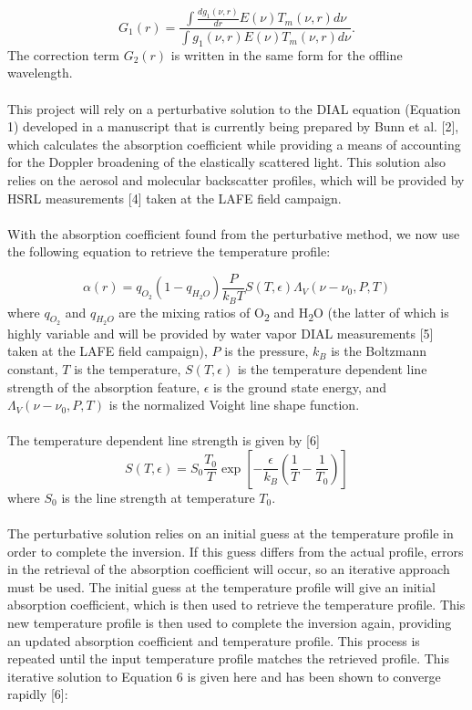 \documentclass[twoside]{article}
\begin{document}
\begin{equation}
	G_1(r) = \frac{\int \frac{dg_1(\nu,r)}{dr} E(\nu) T_m(\nu,r) d\nu}{\int g_1(\nu,r) E(\nu) T_m(\nu,r) d\nu}.
\end{equation}
\noindent The correction term $G_2(r)$ is written in the same form for the offline wavelength.
\\
\\
This project will rely on a perturbative solution to the DIAL equation (Equation 1) developed in a manuscript that is currently being prepared by Bunn et al. [2], which calculates the absorption coefficient while providing a means of accounting for the Doppler broadening of the elastically scattered light. This solution also relies on the aerosol and molecular backscatter profiles, which will be provided by HSRL measurements [4] taken at the LAFE field campaign.
\\
\\
With the absorption coefficient found from the perturbative method, we now use the following equation to retrieve the temperature profile:

\begin{equation}
	\alpha (r) = q_{O_2} (1 - q_{H_2 O}) \frac{P}{k_B T} S(T,\epsilon) \Lambda_V(\nu - \nu_0,P,T)
\end{equation} 
\noindent where $q_{O_2}$ and $q_{H_2 O}$ are the mixing ratios of O\textsubscript{2} and H\textsubscript{2}O (the latter of which is highly variable and will be provided by water vapor DIAL measurements [5] taken at the LAFE field campaign), $P$ is the pressure, $k_B$ is the Boltzmann constant, $T$ is the temperature, $S(T,\epsilon)$ is the temperature dependent line strength of the absorption feature, $\epsilon$ is the ground state energy, and $\Lambda_V(\nu - \nu_0,P,T)$ is the normalized Voight line shape function.
\\
\\
The temperature dependent line strength is given by [6]
\begin{equation}
	S(T,\epsilon) = S_0 \frac{T_0}{T} \exp \left[-\frac{\epsilon}{k_B}\left( \frac{1}{T}-\frac{1}{T_0}\right) \right]
\end{equation}
\noindent where $S_0$ is the line strength at temperature $T_0$. 
\\
\\
The perturbative solution relies on an initial guess at the temperature profile in order to complete the inversion. If this guess differs from the actual profile, errors in the retrieval of the absorption coefficient will occur, so an iterative approach must be used. The initial guess at the temperature profile will give an initial absorption coefficient, which is then used to retrieve the temperature profile. This new temperature profile is then used to complete the inversion again, providing an updated absorption coefficient and temperature profile. This process is repeated until the input temperature profile matches the retrieved profile. This iterative solution to Equation 6 is given here and has been shown to converge rapidly [6]:
\end{document}
